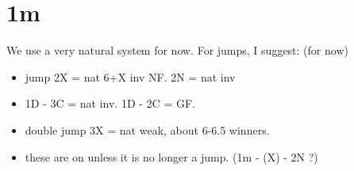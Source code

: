 \section{1m}

We use a very natural system for now. For jumps, I suggest: (for now)
\begin{itemize}
    \setlength\itemsep{0pt}
    \item jump 2X = nat 6+X inv NF. 2N = nat inv
    \item 1D - 3C = nat inv. 1D - 2C = GF.
    \item double jump 3X = nat weak, about 6-6.5 winners.
    \item these are on unless it is no longer a jump. (1m - (X) - 2N ?)
\end{itemize}


